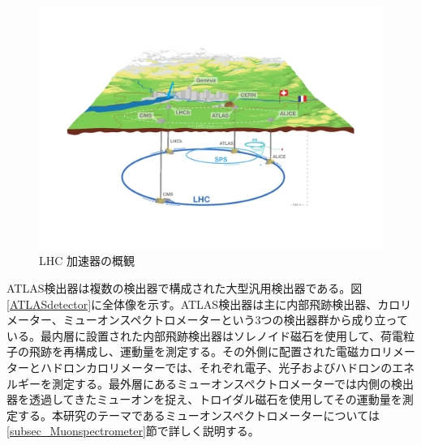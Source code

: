 \begin{figure} 
\centering
\includegraphics[width=16cm]{fig/Intro/LHCoverview.pdf}
\caption[LHC 加速器の概観]{LHC 加速器の概観\cite{cern_general_photo}}
\label{LHCoverview}
\end{figure}

ATLAS検出器は複数の検出器で構成された大型汎用検出器である。図\ref{ATLASdetector}に全体像を示す。ATLAS検出器は主に内部飛跡検出器、カロリメーター、ミューオンスペクトロメーターという3つの検出器群から成り立っている。最内層に設置された内部飛跡検出器はソレノイド磁石を使用して、荷電粒子の飛跡を再構成し、運動量を測定する。その外側に配置された電磁カロリメーターとハドロンカロリメーターでは、それぞれ電子、光子およびハドロンのエネルギーを測定する。最外層にあるミューオンスペクトロメーターでは内側の検出器を透過してきたミューオンを捉え、トロイダル磁石を使用してその運動量を測定する。本研究のテーマであるミューオンスペクトロメーターについては\ref{subsec_Muonspectrometer}節で詳しく説明する。

